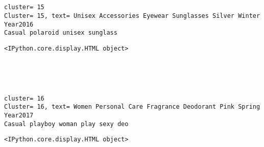 \documentclass[11pt]{article}
\begin{document}
    
    \begin{center}
    \end{center}
    { \hspace*{\fill} \\}
    
    \begin{center}
    \end{center}
    { \hspace*{\fill} \\}
    
    \begin{Verbatim}[commandchars=\\\{\}]
cluster= 15
Cluster= 15, text= Unisex Accessories Eyewear Sunglasses Silver Winter Year2016
Casual polaroid unisex sunglass
    \end{Verbatim}

    
    \begin{Verbatim}[commandchars=\\\{\}]
<IPython.core.display.HTML object>
    \end{Verbatim}

    
    \begin{center}
    \end{center}
    { \hspace*{\fill} \\}
    
    \begin{center}
    \end{center}
    { \hspace*{\fill} \\}
    
    \begin{Verbatim}[commandchars=\\\{\}]
cluster= 16
Cluster= 16, text= Women Personal Care Fragrance Deodorant Pink Spring Year2017
Casual playboy woman play sexy deo
    \end{Verbatim}

    
    \begin{Verbatim}[commandchars=\\\{\}]
<IPython.core.display.HTML object>
    \end{Verbatim}
\end{document}
